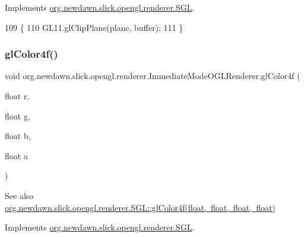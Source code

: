 Implements \mbox{\hyperlink{interfaceorg_1_1newdawn_1_1slick_1_1opengl_1_1renderer_1_1_s_g_l_aa0ecf8896be6f072c3d38372179071f8}{org.\+newdawn.\+slick.\+opengl.\+renderer.\+S\+GL}}.


\begin{DoxyCode}
109                                                             \{
110         GL11.glClipPlane(plane, buffer);
111     \}
\end{DoxyCode}
\mbox{\label{classorg_1_1newdawn_1_1slick_1_1opengl_1_1renderer_1_1_immediate_mode_o_g_l_renderer_afad98c65defdaa9753efabd4e9747cb5}} 
\subsubsection{\texorpdfstring{gl\+Color4f()}{glColor4f()}}
{\footnotesize\ttfamily void org.\+newdawn.\+slick.\+opengl.\+renderer.\+Immediate\+Mode\+O\+G\+L\+Renderer.\+gl\+Color4f (\begin{DoxyParamCaption}\item[{float}]{r,  }\item[{float}]{g,  }\item[{float}]{b,  }\item[{float}]{a }\end{DoxyParamCaption})\hspace{0.3cm}{\ttfamily [inline]}}

\begin{DoxySeeAlso}{See also}
\mbox{\hyperlink{interfaceorg_1_1newdawn_1_1slick_1_1opengl_1_1renderer_1_1_s_g_l_a0dab1e4788ac76db632800701d9b959d}{org.\+newdawn.\+slick.\+opengl.\+renderer.\+S\+G\+L\+::gl\+Color4f(float, float, float, float)}} 
\end{DoxySeeAlso}


Implements \mbox{\hyperlink{interfaceorg_1_1newdawn_1_1slick_1_1opengl_1_1renderer_1_1_s_g_l_a0dab1e4788ac76db632800701d9b959d}{org.\+newdawn.\+slick.\+opengl.\+renderer.\+S\+GL}}.


